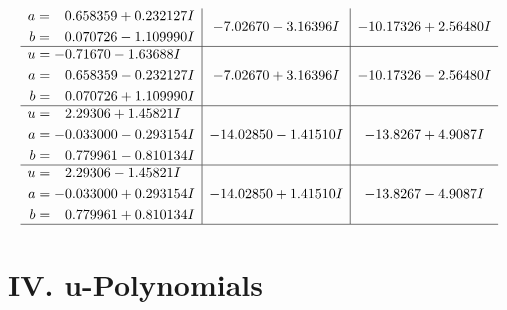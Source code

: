 \documentclass[1p]{elsarticle_modified}
\theoremstyle{definition}
\begin{document}
$$\begin{array}{c|c|c}
\begin{aligned}
a &= \phantom{-}0.658359 + 0.232127 I \\
b &= \phantom{-}0.070726 - 1.109990 I\end{aligned}
 & -7.02670 - 3.16396 I & -10.17326 + 2.56480 I \\ \hline\begin{aligned}
u &= -0.71670 - 1.63688 I \\
a &= \phantom{-}0.658359 - 0.232127 I \\
b &= \phantom{-}0.070726 + 1.109990 I\end{aligned}
 & -7.02670 + 3.16396 I & -10.17326 - 2.56480 I \\ \hline\begin{aligned}
u &= \phantom{-}2.29306 + 1.45821 I \\
a &= -0.033000 - 0.293154 I \\
b &= \phantom{-}0.779961 - 0.810134 I\end{aligned}
 & -14.02850 - 1.41510 I & -13.8267 + 4.9087 I \\ \hline\begin{aligned}
u &= \phantom{-}2.29306 - 1.45821 I \\
a &= -0.033000 + 0.293154 I \\
b &= \phantom{-}0.779961 + 0.810134 I\end{aligned}
 & -14.02850 + 1.41510 I & -13.8267 - 4.9087 I\\
 \hline 
 \end{array}$$\newpage
\newpage\renewcommand{\arraystretch}{1}
\centering \section*{ IV. u-Polynomials}
\end{document}
